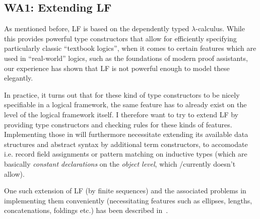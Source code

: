 
\subsection{\textbf{WA1}: Extending LF}\label{sec:extendingLF}
As mentioned before, LF is based on the dependently typed $\lambda$-calculus. While this provides powerful type constructors that allow for efficiently specifying particularly classic ``textbook logics'', when it comes to certain features which are used in ``real-world'' logics, such as the foundations of modern proof assistants, our experience has shown that LF is not powerful enough to model these elegantly.

In practice, it turns out that for these kind of type constructors to be nicely specifiable in a logical framework, the same feature has to already exist on the level of the logical framework itself.
I therefore want to try to extend LF by providing type constructors and checking rules for these kinds of features. Implementing those in \mmt will furthermore necessitate extending its available data structures and abstract syntax by additional term constructors, to accomodate i.e. record field assignments or pattern matching on inductive types (which are basically \emph{constant declarations} on the \emph{object level}, which \omdoc/\mmt currently doesn't allow).

One such extension of LF (by finite sequences) and the associated problems in implementing them conveniently (necessitating features such as ellipses, lengths, concatenations, foldings etc.) has been described in~\cite{Horozal:afddl14}.

